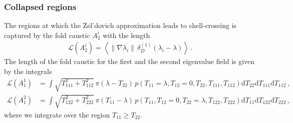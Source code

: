 \documentclass[a4paper, 11pt]{article}
\begin{document}
\subsubsection{Collapsed regions}
The regions at which the Zel'dovich approximation leads to shell-crossing is captured by the fold caustic $A_2^i$ with the length
\begin{align}
\mathcal{L}(A_2^i) = \left\langle \|\nabla \lambda_i\|\, \delta_D^{(1)}(\lambda_i - \lambda)\right \rangle\,.
\end{align}
The length of the fold caustic for the first and the second eigenvalue field is given by the integrals
\begin{align}
\mathcal{L}(A_1^1)&=\int \sqrt{T_{111}^2+T_{112}^2}\, \pi (\lambda-T_{22})\, p(T_{11}=\lambda, T_{12}=0,T_{22},T_{111},T_{112})\mathrm{d}T_{22}\mathrm{d}T_{111}\mathrm{d}T_{112}\,,\\
\mathcal{L}(A_1^2)&=\int \sqrt{T_{122}^2 + T_{222}^2}\, \pi (T_{11}-\lambda)\, p(T_{11},T_{12}=0,T_{22}=\lambda, T_{122},T_{222})
\mathrm{d}T_{11}\mathrm{d}T_{122}\mathrm{d}T_{222}\,,
\end{align}
where we integrate over the region $T_{11} \geq T_{22}$.

\end{document}
